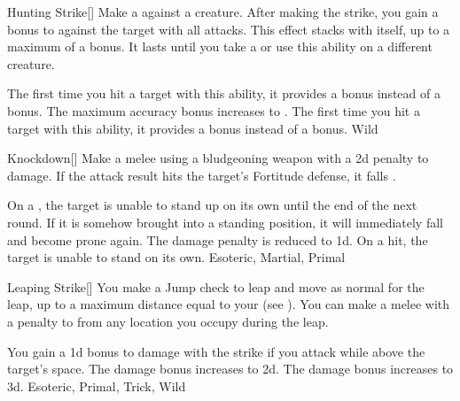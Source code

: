 \lowercase{\hypertarget{maneuver:Hunting Strike}{}}\label{maneuver:Hunting Strike}
\hypertarget{maneuver:Hunting Strike}{}
\begin{freeability}[Rank 1]{Hunting Strike}[]
Make a  against a creature.
After making the strike, you gain a  bonus to  against the target with all attacks.
This effect stacks with itself, up to a maximum of a  bonus.
It lasts until you take a  or use this ability on a different creature.

\rankline
{} The first time you hit a target with this ability, it provides a  bonus instead of a  bonus.
 The maximum accuracy bonus increases to .
 The first time you hit a target with this ability, it provides a  bonus instead of a  bonus.
 Wild
\end{freeability}
\vspace{0.25em}



\lowercase{\hypertarget{maneuver:Knockdown}{}}\label{maneuver:Knockdown}
\hypertarget{maneuver:Knockdown}{}
\begin{freeability}[Rank 1]{Knockdown}[]
Make a melee  using a bludgeoning weapon with a \minus2d penalty to damage.
If the attack result hits the target's Fortitude defense,
it falls .

\rankline
{} On a , the target is unable to stand up on its own until the end of the next round.
If it is somehow brought into a standing position, it will immediately fall and become prone again.
 The damage penalty is reduced to \minus1d.
 On a hit, the target is unable to stand on its own.
 Esoteric, Martial, Primal
\end{freeability}
\vspace{0.25em}



\lowercase{\hypertarget{maneuver:Leaping Strike}{}}\label{maneuver:Leaping Strike}
\hypertarget{maneuver:Leaping Strike}{}
\begin{freeability}[Rank 1]{Leaping Strike}[]
You make a Jump check to leap and move as normal for the leap, up to a maximum distance equal to your  (see ).
You can make a melee  with a  penalty to  from any location you occupy during the leap.

\rankline
{} You gain a \plus1d bonus to damage with the strike if you attack while above the target's space.
 The damage bonus increases to \plus2d.
 The damage bonus increases to \plus3d.
 Esoteric, Primal, Trick, Wild
\end{freeability}
\vspace{0.25em}



